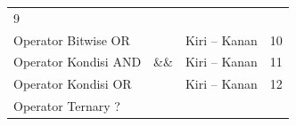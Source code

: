 \begin{longtable}[]{@{}llll@{}}
\begin{minipage}[t]{0.05\columnwidth}
9
\strut\end{minipage}\tabularnewline
\begin{minipage}[t]{0.52\columnwidth}\raggedright\strut
Operator Bitwise OR
\strut\end{minipage} &
\begin{minipage}[t]{0.17\columnwidth}\raggedright\strut
\texttt{\textbar{}}
\strut\end{minipage} &
\begin{minipage}[t]{0.14\columnwidth}\raggedright\strut
Kiri -- Kanan
\strut\end{minipage} &
\begin{minipage}[t]{0.05\columnwidth}\raggedright\strut
10
\strut\end{minipage}\tabularnewline
\begin{minipage}[t]{0.52\columnwidth}\raggedright\strut
Operator Kondisi AND
\strut\end{minipage} &
\begin{minipage}[t]{0.17\columnwidth}\raggedright\strut
\&\&
\strut\end{minipage} &
\begin{minipage}[t]{0.14\columnwidth}\raggedright\strut
Kiri -- Kanan
\strut\end{minipage} &
\begin{minipage}[t]{0.05\columnwidth}\raggedright\strut
11
\strut\end{minipage}\tabularnewline
\begin{minipage}[t]{0.52\columnwidth}\raggedright\strut
Operator Kondisi OR
\strut\end{minipage} &
\begin{minipage}[t]{0.17\columnwidth}\raggedright\strut
\texttt{\textbar{}\textbar{}}
\strut\end{minipage} &
\begin{minipage}[t]{0.14\columnwidth}\raggedright\strut
Kiri -- Kanan
\strut\end{minipage} &
\begin{minipage}[t]{0.05\columnwidth}\raggedright\strut
12
\strut\end{minipage}\tabularnewline
\begin{minipage}[t]{0.52\columnwidth}\raggedright\strut
Operator Ternary ?
\strut\end{minipage} &
\begin{minipage}[t]{0.17\columnwidth}\raggedright\strut
\texttt{\textbar{}}
\strut\end{minipage} &
\begin{minipage}[t]{0.14\columnwidth}\raggedright\strut

\end{minipage}
\end{longtable}
